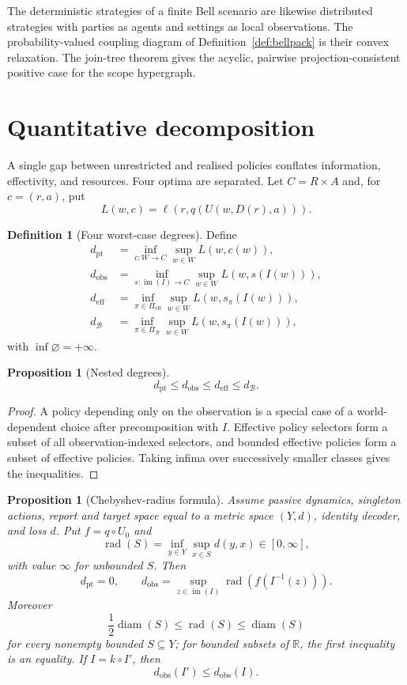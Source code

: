 \documentclass[11pt]{article}
\theoremstyle{plain}
\newtheorem{proposition}[theorem]{Proposition}
\theoremstyle{definition}
\newtheorem{definition}[theorem]{Definition}
\theoremstyle{remark}
\newcommand{\im}{\operatorname{im}}
\begin{document}
The deterministic strategies of a finite Bell scenario are likewise distributed
strategies with parties as agents and settings as local observations. The probability-valued coupling diagram of Definition~\ref{def:bellpack} is
their convex relaxation. The join-tree theorem gives the acyclic, pairwise
projection-consistent positive case for the scope hypergraph.




\section{Quantitative decomposition}\label{sec:quant}

A single gap between unrestricted and realised policies conflates information,
effectivity, and resources. Four optima are separated. Let
$C=R\times A$ and, for $c=(r,a)$, put
\[
L(w,c)=\ell(r,q(U(w,D(r),a))).
\]

\begin{definition}[Four worst-case degrees]\label{def:degree}
Define
\begin{align*}
d_{\mathrm{pt}}
&=\inf_{c:W\to C}\sup_{w\in W}L(w,c(w)),\\
d_{\mathrm{obs}}
&=\inf_{s:\im(I)\to C}\sup_{w\in W}L(w,s(I(w))),\\
d_{\mathrm{eff}}
&=\inf_{\pi\in\Pi_{\mathrm{eff}}}\sup_{w\in W}L(w,s_\pi(I(w))),\\
d_{\mathcal B}
&=\inf_{\pi\in\Pi_{\mathcal B}}\sup_{w\in W}L(w,s_\pi(I(w))),
\end{align*}
with $\inf\varnothing=+\infty$.
\end{definition}

\begin{proposition}[Nested degrees]\label{prop:tax}
\[
d_{\mathrm{pt}}
\le d_{\mathrm{obs}}
\le d_{\mathrm{eff}}
\le d_{\mathcal B}.
\]
\end{proposition}

\begin{proof}
A policy depending only on the observation is a special case of a world-dependent
choice after precomposition with $I$. Effective policy selectors form a subset
of all observation-indexed selectors, and bounded effective policies form a
subset of effective policies. Taking infima over successively smaller classes
gives the inequalities.
\end{proof}

\begin{proposition}[Chebyshev-radius formula]\label{prop:chebyshev}
Assume passive dynamics, singleton actions, report and target space equal to a
metric space $(Y,d)$, identity decoder, and loss $d$. Put $f=q\circ U_0$ and
\[
\operatorname{rad}(S)=\inf_{y\in Y}\sup_{x\in S}d(y,x)
\in[0,\infty],
\]
with value $\infty$ for unbounded $S$. Then
\[
d_{\mathrm{pt}}=0,
\qquad
d_{\mathrm{obs}}
=\sup_{z\in\im(I)}
\operatorname{rad}(f(I^{-1}(z))).
\]
Moreover
\[
\frac12\operatorname{diam}(S)
\le\operatorname{rad}(S)
\le\operatorname{diam}(S)
\]
for every nonempty bounded $S\subseteq Y$; for bounded subsets of $\mathbb R$,
the first inequality is an equality. If $I=k\circ I'$, then
\[
d_{\mathrm{obs}}(I')\le d_{\mathrm{obs}}(I).
\]
\end{proposition}
\end{document}
